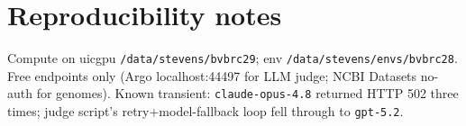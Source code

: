\documentclass[11pt]{article}
\begin{document}
\section{Reproducibility notes}
Compute on uicgpu \texttt{/data/stevens/bvbrc29}; env \texttt{/data/stevens/envs/bvbrc28}. Free endpoints only (Argo localhost:44497 for LLM judge; NCBI Datasets no-auth for genomes). Known transient: \texttt{claude-opus-4.8} returned HTTP 502 three times; judge script's retry+model-fallback loop fell through to \texttt{gpt-5.2}.


\end{document}

